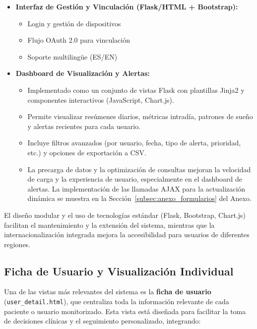 \begin{itemize}
    \item \textbf{Interfaz de Gestión y Vinculación (Flask/HTML + Bootstrap):}
        \begin{itemize}
            \item Login y gestión de dispositivos
            \item Flujo OAuth 2.0 para vinculación
            \item Soporte multilingüe (ES/EN)
        \end{itemize}
    \item \textbf{Dashboard de Visualización y Alertas:}
        \begin{itemize}
            \item Implementado como un conjunto de vistas Flask con plantillas Jinja2 y componentes interactivos (JavaScript, Chart.js).
            \item Permite visualizar resúmenes diarios, métricas intradía, patrones de sueño y alertas recientes para cada usuario.
            \item Incluye filtros avanzados (por usuario, fecha, tipo de alerta, prioridad, etc.) y opciones de exportación a CSV.
            \item La precarga de datos y la optimización de consultas mejoran la velocidad de carga y la experiencia de usuario, especialmente en el dashboard de alertas. La implementación de las llamadas AJAX para la actualización dinámica se muestra en la Sección~\ref{subsec:anexo_formularios} del Anexo.
        \end{itemize}
\end{itemize}

El diseño modular y el uso de tecnologías estándar (Flask, Bootstrap, Chart.js) facilitan el mantenimiento y la extensión del sistema, mientras que la internacionalización integrada mejora la accesibilidad para usuarios de diferentes regiones.

\subsection{Ficha de Usuario y Visualización Individual}
Una de las vistas más relevantes del sistema es la \textbf{ficha de usuario} (\texttt{user\_detail.html}), que centraliza toda la información relevante de cada paciente o usuario monitorizado. Esta vista está diseñada para facilitar la toma de decisiones clínicas y el seguimiento personalizado, integrando:

